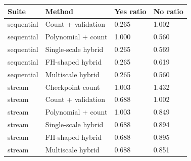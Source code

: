\begin{tabular}{llll}
\toprule
Suite & Method & Yes ratio & No ratio \\
\midrule
sequential & Count + validation & 0.265 & 1.002 \\
sequential & Polynomial + count & 1.000 & 0.560 \\
sequential & Single-scale hybrid & 0.265 & 0.569 \\
sequential & FH-shaped hybrid & 0.265 & 0.619 \\
sequential & Multiscale hybrid & 0.265 & 0.560 \\
stream & Checkpoint count & 1.003 & 1.432 \\
stream & Count + validation & 0.688 & 1.002 \\
stream & Polynomial + count & 1.003 & 0.849 \\
stream & Single-scale hybrid & 0.688 & 0.894 \\
stream & FH-shaped hybrid & 0.688 & 0.895 \\
stream & Multiscale hybrid & 0.688 & 0.851 \\
\bottomrule
\end{tabular}
